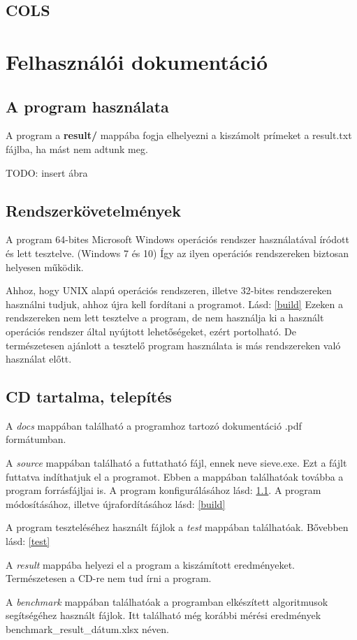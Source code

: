 \documentclass[twoside, a4paper, 12pt]{article}
\begin{document}
\subsection{COLS}

\clearpage
\section{Felhasználói dokumentáció}

\subsection{A program használata} \label{usage}

A program a \textbf{result/} mappába fogja elhelyezni a kiszámolt prímeket a result.txt fájlba, ha mást nem adtunk meg.\par
TODO: insert ábra

\subsection{Rendszerkövetelmények}

A program 64-bites Microsoft Windows operációs rendszer használatával íródott és lett tesztelve. (Windows 7 és 10) Így az ilyen operációs rendszereken biztosan helyesen működik. \par
Ahhoz, hogy UNIX alapú operációs rendszeren, illetve 32-bites rendszereken használni tudjuk, ahhoz újra kell fordítani a programot. Lásd: \ref{build} Ezeken a rendszereken nem lett tesztelve a program, de nem használja ki a használt operációs rendszer által nyújtott lehetőségeket, ezért portolható. De természetesen ajánlott a tesztelő program használata is más rendszereken való használat előtt.

\subsection{CD tartalma, telepítés}

A \textit{docs} mappában található a programhoz tartozó dokumentáció .pdf formátumban. \par
A \textit{source} mappában található a futtatható fájl, ennek neve sieve.exe. Ezt a fájlt futtatva indíthatjuk el a programot. Ebben a mappában találhatóak továbba a program forrásfájljai is.  A program konfigurálásához lásd: \ref{usage}. A program módosításához, illetve újrafordításához lásd: \ref{build} \par
A program teszteléséhez használt fájlok a \textit{test} mappában találhatóak. Bővebben lásd: \ref{test} \par
A \textit{result} mappába helyezi el a program a kiszámított eredményeket. Természetesen a CD-re nem tud írni a program. \par
A \textit{benchmark} mappában találhatóak a programban elkészített algoritmusok segítségéhez használt fájlok. Itt található még korábbi mérési eredmények benchmark\_result\_dátum.xlsx néven. \bigskip
\end{document}
